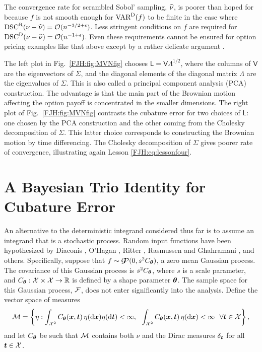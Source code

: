 \documentclass[graybox,footinfo]{svmult}
\begin{document}
The convergence rate for scrambled Sobol' sampling, $\widehat{\nu}$,  is poorer than hoped for 
because 
$f$ is not smooth enough for $\textup{VAR}^{\textup{D}}(f)$ to be finite in the case 
where $\textup{DSC}^{\textup{R}}(\nu - \widehat{\nu}) = {\mathcal{O}}(n^{-3/2 +\epsilon})$.  Less 
stringent conditions on $f$ are required for $\textup{DSC}^{\textup{D}}(\nu - \widehat{\nu}) = 
{\mathcal{O}}(n^{-1 +\epsilon})$.  Even these requirements cannot 
be ensured for option pricing examples like that above except by a rather delicate 
argument \cite{GriKuoSlo10, GriKuoSlo16}.

\begin{FJHLesson}
	\FJHLessonFive
\end{FJHLesson}

The left plot in Fig.\ \ref{FJH:fig:MVNfig} chooses $\mathsf{L} = 
\mathsf{V}\mathsf{\Lambda}^{1/2}$, where the columns of $\mathsf{V}$ are the 
eigenvectors of $\mathsf{\Sigma}$, and the diagonal elements of the diagonal matrix  
$\mathsf{\Lambda}$ are the eigenvalues of $\mathsf{\Sigma}$.  This is also called a 
principal component analysis (PCA) construction.  The advantage is that the main part of 
the 
Brownian motion affecting the option payoff is concentrated in the smaller dimensions.  
The right plot of Fig.\ 
\ref{FJH:fig:MVNfig} contrasts the cubature error for two choices of  $\mathsf{L}$:  one 
chosen by the PCA construction and the other coming from the Cholesky decomposition 
of $\mathsf{\Sigma}$.  This latter choice corresponds to constructing the Brownian 
motion by time 
differencing.  The Cholesky decomposition of $\mathsf{\Sigma}$ gives poorer rate of 
convergence, illustrating again Lesson \ref{FJH:eq:lessonfour}.


\section{A Bayesian Trio  Identity for Cubature Error} \label{FJH:sec:BayesTrio}
An alternative to the deterministic integrand considered thus far is to assume an 
integrand that is a stochastic process.  Random input functions have been hypothesized 
by 
Diaconis \cite{Dia88a}, O'Hagan \cite{OHa91a}, Ritter \cite{Rit00a}, Rasmussen and 
Ghahramani \cite{RasGha03a}, and others. Specifically, suppose that $f \sim {\mathcal{G}}\!\!{\mathcal{P}} (0, 
s^2C_{{\boldsymbol{\theta}}})$, a zero mean Gaussian process.  The covariance of 
this  Gaussian process is $s^2C_{{\boldsymbol{\theta}}}$, where $s$ is a scale parameter, and 
$C_{{\boldsymbol{\theta}}}:{\mathcal{X}} \times {\mathcal{X}} \to {\mathbb{R}}$ is defined by a shape parameter ${\boldsymbol{\theta}}$.  
The 
sample space for this Gaussian process, ${\mathcal{F}}$, does not enter significantly into the 
analysis.  Define the vector space of measures 
\begin{equation*}
{\mathcal{M}} = \left\{\eta :  \int_{{\mathcal{X}}^2} C_{\boldsymbol{\theta}}({\boldsymbol{x}},{\boldsymbol{t}}) 
\, \eta(\mathrm{d} {\boldsymbol{x}}) \eta(\mathrm{d} {\boldsymbol{t}}) < \infty, \ \ \int_{{\mathcal{X}}^2} C_{\boldsymbol{\theta}}({\boldsymbol{x}},{\boldsymbol{t}}) 
\, \eta(\mathrm{d} {\boldsymbol{x}}) < \infty \ \ \forall {\boldsymbol{t}} \in {\mathcal{X}} \right \},
\end{equation*}
and let $C_{{\boldsymbol{\theta}}}$ be such that ${\mathcal{M}}$ contains both $\nu$ and the Dirac 
measures 
$\delta_{{\boldsymbol{t}}}$ for all ${\boldsymbol{t}} \in {\mathcal{X}}$. 
\end{document}
